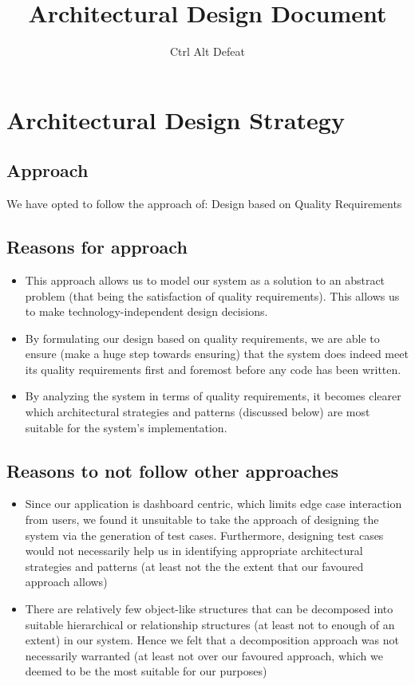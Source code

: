 \documentclass[12pt]{article}
\title{Architectural Design Document}
\author{Ctrl Alt Defeat}
\begin{document}

\tableofcontents
\newpage
\section{Architectural Design Strategy}
\subsection{Approach}
We have opted to follow the approach of: Design based on Quality Requirements
\subsection{Reasons for approach}
\begin{itemize}
    \item This approach allows us to model our system as a solution to an abstract problem (that being the satisfaction of quality requirements). This allows us to  make technology-independent design decisions.
    \item By formulating our design based on quality requirements, we are able to ensure (make a huge step towards ensuring) that the system does indeed meet its quality requirements first and foremost before any code has been written.
    \item By analyzing the system in terms of quality requirements, it becomes clearer which architectural strategies and patterns (discussed below) are most suitable for the system's implementation.
\end{itemize}
\subsection{Reasons to not follow other approaches}
\begin{itemize}
    \item Since our application is dashboard centric, which limits edge case interaction from users, we found it unsuitable to take the approach of designing the system via the generation of test cases. Furthermore, designing test cases would not necessarily help us in identifying appropriate architectural strategies and patterns (at least not the the extent that our favoured approach allows)
    \item There are relatively few object-like structures that can be decomposed into suitable hierarchical or relationship structures (at least not to enough of an extent) in our system. Hence we felt that a decomposition approach was not necessarily warranted (at least not over our favoured approach, which we deemed to be the most suitable for our purposes)
\end{itemize}
\end{document}
